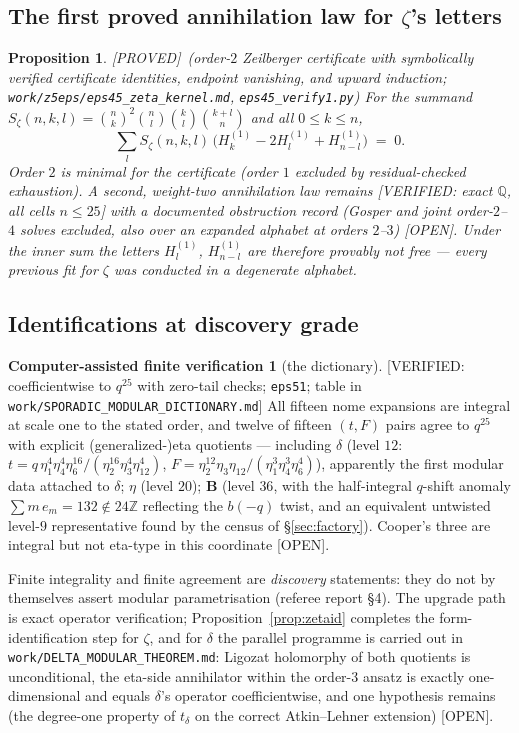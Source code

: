 \documentclass[11pt,reqno]{amsart}
\theoremstyle{plain}
\newtheorem{proposition}[theorem]{Proposition}
\theoremstyle{definition}
\newtheorem{verification}[theorem]{Computer-assisted finite verification}
\theoremstyle{remark}
\newcommand{\Z}{\mathbb{Z}}
\newcommand{\Q}{\mathbb{Q}}
\newcommand{\bin}[2]{\binom{#1}{#2}}
\newcommand{\HH}[2]{H^{(#1)}_{#2}}
\newcommand{\Proved}{\textup{\textsf{[PROVED]}}}
\newcommand{\VerifiedR}[1]{\textup{\textsf{[VERIFIED: #1]}}}
\newcommand{\Open}{\textup{\textsf{[OPEN]}}}
\begin{document}
\subsection{The first proved annihilation law for $\zeta$'s letters}
\begin{proposition}\label{prop:ann}
\Proved\ (order-$2$ Zeilberger certificate with symbolically verified
certificate identities, endpoint vanishing, and upward induction;
\texttt{work/z5eps/eps45\_zeta\_kernel.md}, \texttt{eps45\_verify1.py})\quad
For the summand $S_\zeta(n,k,l)=\bin nk^2\bin nl\bin kl\bin{k+l}n$ and all
$0\le k\le n$,
\[
\sum_{l}S_\zeta(n,k,l)\,\bigl(\HH1k-2\HH1l+\HH1{n-l}\bigr)\;=\;0 .
\]
Order $2$ is minimal for the certificate (order $1$ excluded by
residual-checked exhaustion). A second, weight-two annihilation law
remains \VerifiedR{exact $\Q$, all cells $n\le25$} with a documented
obstruction record (Gosper and joint order-$2$--$4$ solves excluded, also
over an expanded alphabet at orders $2$--$3$) \Open. Under the inner sum
the letters $\HH1l$, $\HH1{n-l}$ are therefore provably not free ---
every previous fit for $\zeta$ was conducted in a degenerate alphabet.
\end{proposition}

\subsection{Identifications at discovery grade}
\begin{verification}[the dictionary]\label{ver:dict}
\VerifiedR{coefficientwise to $q^{25}$ with zero-tail checks;
\texttt{eps51}; table in \texttt{work/SPORADIC\_MODULAR\_DICTIONARY.md}}\quad
All fifteen nome expansions are integral at scale one to the stated
order, and twelve of fifteen $(t,F)$ pairs agree to $q^{25}$ with explicit
(generalized-)eta quotients --- including
$\delta$ (level $12$: $t=q\,\eta_1^4\eta_4^4\eta_6^{16}/
(\eta_2^{16}\eta_3^4\eta_{12}^4)$,
$F=\eta_2^{12}\eta_3\eta_{12}/(\eta_1^3\eta_4^3\eta_6^4)$), apparently the
first modular data attached to $\delta$;
$\eta$ (level $20$); $\mathbf B$ (level $36$, with the half-integral
$q$-shift anomaly $\sum m\,e_m=132\notin24\Z$ reflecting the $b(-q)$
twist, and an equivalent untwisted level-$9$ representative found by the
census of \S\ref{sec:factory}). Cooper's three are integral but not
eta-type in this coordinate \Open.

Finite integrality and finite agreement are \emph{discovery} statements:
they do not by themselves assert modular parametrisation (referee report
\S4). The upgrade path is exact operator verification;
Proposition~\ref{prop:zetaid} completes the form-identification step for
$\zeta$, and for $\delta$ the parallel programme is carried out in
\texttt{work/DELTA\_MODULAR\_THEOREM.md}: Ligozat holomorphy of both
quotients is unconditional, the eta-side annihilator within the order-$3$
ansatz is exactly one-dimensional and equals $\delta$'s operator
coefficientwise, and one hypothesis remains (the degree-one property of
$t_\delta$ on the correct Atkin--Lehner extension) \Open.
\end{verification}
\end{document}
